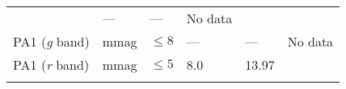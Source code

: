 \documentclass[DM,toc]{lsstdoc}
\begin{document}
\begin{longtable}[]{@{}llllll@{}}
\begin{minipage}[t]{0.17\columnwidth}
\end{minipage} & \begin{minipage}[t]{0.17\columnwidth}\raggedright\strut
---\strut
\end{minipage} & \begin{minipage}[t]{0.12\columnwidth}\raggedright\strut
---\strut
\end{minipage} & \begin{minipage}[t]{0.17\columnwidth}\raggedright\strut
No data\strut
\end{minipage}\tabularnewline
\begin{minipage}[t]{0.14\columnwidth}\raggedright\strut
PA1 (\emph{g} band)\strut
\end{minipage} & \begin{minipage}[t]{0.06\columnwidth}\raggedright\strut
mmag\strut
\end{minipage} & \begin{minipage}[t]{0.17\columnwidth}\raggedright\strut
\(\leq 8\)\strut
\end{minipage} & \begin{minipage}[t]{0.17\columnwidth}\raggedright\strut
---\strut
\end{minipage} & \begin{minipage}[t]{0.12\columnwidth}\raggedright\strut
---\strut
\end{minipage} & \begin{minipage}[t]{0.17\columnwidth}\raggedright\strut
No data\strut
\end{minipage}\tabularnewline
\begin{minipage}[t]{0.14\columnwidth}\raggedright\strut
PA1 (\emph{r} band)\strut
\end{minipage} & \begin{minipage}[t]{0.06\columnwidth}\raggedright\strut
mmag\strut
\end{minipage} & \begin{minipage}[t]{0.17\columnwidth}\raggedright\strut
\(\leq 5\)\strut
\end{minipage} & \begin{minipage}[t]{0.17\columnwidth}\raggedright\strut
8.0\strut
\end{minipage} & \begin{minipage}[t]{0.12\columnwidth}\raggedright\strut
13.97\strut
\end{minipage} & \begin{minipage}[t]{0.17\columnwidth}\raggedright\strut
\strut
\end{minipage}\tabularnewline
\begin{minipage}[t]{0.14\columnwidth}\raggedright\strut

\end{minipage}
\end{longtable}
\end{document}
